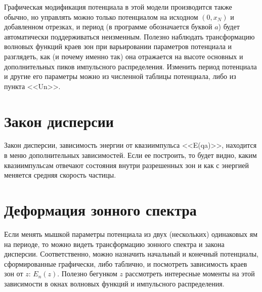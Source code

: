 \documentclass[12pt]{article}
\begin{document}
Графическая модификация потенциала в этой модели производится также обычно, но управлять можно только потенциалом
на исходном $(0,x_N)$ и добавленном отрезках, и период (в программе обозначается буквой $a$) будет автоматически
поддерживаться неизменным. Полезно наблюдать трансформацию волновых функций краев зон при варьировании параметров
потенциала и разглядеть, как (и почему именно так) она отражается на высоте основных и дополнительных пиков
импульсного распределения. Изменить период потенциала и другие его параметры можно из численной таблицы потенциала,
либо из пункта <<Un>>.
\hypertarget{qaOfE}{}\section{Закон дисперсии}
Закон дисперсии, зависимость энергии от квазиимпульса <<E(qa)>>, находится в меню дополнительных зависимостей.
Если ее построить, то будет видно, каким квазиимпульсам отвечают состояния внутри разрешенных зон и как с энергией меняется средняя скорость частицы.


\hypertarget{Uz_per}{}\section{Деформация зонного спектра}
Если менять мышкой параметры потенциала из двух (нескольких) одинаковых ям на
периоде, то можно видеть трансформацию зонного спектра и закона дисперсии. Соответственно,
можно назначить начальный и конечный потенциалы, сформированные графически, либо таблично, и посмотреть
зависимость краев зон от $z$: $E_n(z)$. Полезно бегунком $z$ рассмотреть интересные моменты
на этой зависимости в окнах волновых функций и импульсного распределения.
\end{document}
